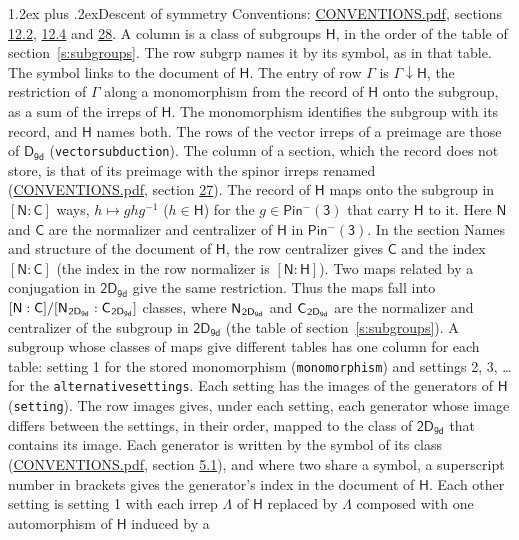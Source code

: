 \documentclass[10pt,a4paper]{article}
\makeatletter
\renewcommand\section{\@startsection{section}{1}{\z@}{-3ex plus -1ex minus -.2ex}%
  {1.2ex plus .2ex}{\normalfont\large\sffamily\bfseries\color{parttitle}}}
\numberwithin{equation}{section}
\newcommand{\grp}[1]{\mathsf{#1}}
\newcommand{\grpindex}[2]{[#1 : #2]}
\newcommand{\restr}[2]{#1\!\downarrow#2}
\newcommand{\hairsp}{\mkern1mu}
\makeatother
\begin{document}
\section{Descent of symmetry}\label{s:subduction}
Conventions: \href{../../CONVENTIONS.pdf}{CONVENTIONS.pdf}, sections \href{../../../rotation/CONVENTIONS.pdf\#conv.12.2}{12.2}, \href{../../../rotation/CONVENTIONS.pdf\#conv.12.4}{12.4} and \href{../../CONVENTIONS.pdf\#conv.28}{28}.
A column is a class of subgroups $\grp{H}$, in the order of the table of section~\ref{s:subgroups}. The row subgrp names it by its symbol, as in that table. The symbol links to the document of $\grp{H}$. The entry of row $\Gamma$ is $\restr{\Gamma}{\grp{H}}$, the restriction of $\Gamma$ along a monomorphism from the record of $\grp{H}$ onto the subgroup, as a sum of the irreps of $\grp{H}$. The monomorphism identifies the subgroup with its record, and $\grp{H}$ names both. The rows of the vector irreps of a preimage are those of \href{../../../rotation/data/pdf/D9d.pdf}{$\grp{D_{9d}}$} (\texttt{vectorsubduction}). The column of a section, which the record does not store, is that of its preimage with the spinor irreps renamed (\href{../../CONVENTIONS.pdf}{CONVENTIONS.pdf}, section \href{../../CONVENTIONS.pdf\#conv.27}{27}). \label{n:group.normalizer.o3}\label{n:group.centralizer.o3}\label{n:element.h}The record of $\grp{H}$ maps onto the subgroup in $\grpindex{\grp{N}}{\grp{C}}$ ways, $h \mapsto g h g^{-1}$ ($h \in \grp{H}$) for the $g \in \grp{Pin^{-}(3)}$ that carry $\grp{H}$ to it. Here $\grp{N}$ and $\grp{C}$ are the normalizer and centralizer of $\grp{H}$ in \href{Pinminus3.pdf}{$\grp{Pin^{-}(3)}$}. In the section Names and structure of the document of $\grp{H}$, the row centralizer gives $\grp{C}$ and the index $\grpindex{\grp{N}}{\grp{C}}$ (the index in the row normalizer is $\grpindex{\grp{N}}{\grp{H}}$). Two maps related by a conjugation in $\grp{2D_{9d}}$ give the same restriction. Thus the maps fall into $\grpindex{\grp{N}}{\grp{C}}/\grpindex{\grp{N}_{\hairsp \grp{2D_{9d}}}}{\grp{C}_{\hairsp \grp{2D_{9d}}}}$ classes, where $\grp{N}_{\hairsp \grp{2D_{9d}}}$ and $\grp{C}_{\hairsp \grp{2D_{9d}}}$ are the normalizer and centralizer of the subgroup in $\grp{2D_{9d}}$ (the table of section~\ref{s:subgroups}). \label{n:head.setting}A subgroup whose classes of maps give different tables has one column for each table: setting 1 for the stored monomorphism (\texttt{monomorphism}) and settings 2, 3, \dots{} for the \texttt{alternativesettings}. Each setting has the images of the generators of $\grp{H}$ (\texttt{setting}). \label{n:head.images}The row images gives, under each setting, each generator whose image differs between the settings, in their order, mapped to the class of $\grp{2D_{9d}}$ that contains its image. Each generator is written by the symbol of its class (\href{../../CONVENTIONS.pdf}{CONVENTIONS.pdf}, section \href{../../../rotation/CONVENTIONS.pdf\#conv.5.1}{5.1}), and where two share a symbol, a superscript number in brackets gives the generator's index in the document of $\grp{H}$. \label{n:irrep.Delta}Each other setting is setting 1 with each irrep $\Lambda$ of $\grp{H}$ replaced by $\Lambda$ composed with one automorphism of $\grp{H}$ induced by a 
\end{document}
